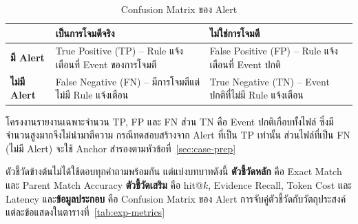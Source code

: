\begin{table}[ht]
  \centering
  \caption{Confusion Matrix ของ Alert}
  \label{tab:alert-confusion}
  \small
  \begin{tabular}{|l|L{0.33\textwidth}|L{0.33\textwidth}|}
    \hline
     & \textbf{เป็นการโจมตีจริง} & \textbf{ไม่ใช่การโจมตี} \\ \hline
    \textbf{มี Alert} & True Positive (TP) -- Rule แจ้งเตือนที่ Event ของการโจมตี
                     & False Positive (FP) -- Rule แจ้งเตือนที่ Event ปกติ \\ \hline
    \textbf{ไม่มี Alert} & False Negative (FN) -- มีการโจมตีแต่ไม่มี Rule แจ้งเตือน
                        & True Negative (TN) -- Event ปกติที่ไม่มี Rule แจ้งเตือน \\ \hline
  \end{tabular}
\end{table}

โครงงานรายงานเฉพาะจำนวน TP, FP และ FN ส่วน TN คือ Event ปกติเกือบทั้งไฟล์
ซึ่งมีจำนวนสูงมากจึงไม่นำมาตีความ กรณีทดสอบสร้างจาก Alert ที่เป็น TP เท่านั้น
ส่วนไฟล์ที่เป็น FN (ไม่มี Alert) จะใช้ Anchor สำรองตามหัวข้อที่~\ref{sec:case-prep}

ตัวชี้วัดข้างต้นไม่ได้ใช้ตอบทุกคำถามพร้อมกัน แต่แบ่งบทบาทดังนี้
\textbf{ตัวชี้วัดหลัก} คือ Exact Match และ Parent Match Accuracy
\textbf{ตัวชี้วัดเสริม} คือ hit@$k$, Evidence Recall, Token Cost และ Latency
และ\textbf{ข้อมูลประกอบ} คือ Confusion Matrix ของ Alert
การจับคู่ตัวชี้วัดกับวัตถุประสงค์แต่ละข้อแสดงในตารางที่~\ref{tab:exp-metrics}


